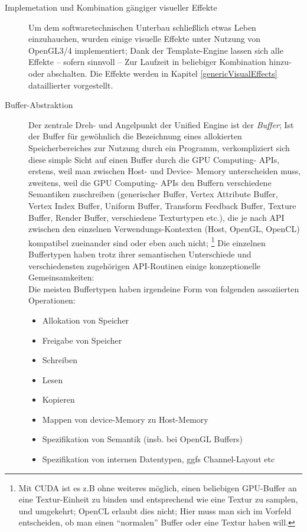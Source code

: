 \begin{description}
	
	\item[Implemetation und Kombination gängiger visueller Effekte]
	Um dem softwaretechnischen Unterbau schließlich etwas Leben einzuhauchen, wurden einige visuelle Effekte unter
	Nutzung von OpenGL3/4 implementiert; Dank der Template-Engine lassen sich alle Effekte -- sofern sinnvoll --
	Zur Laufzeit in beliebiger Kombination hinzu- oder abschalten.
	Die Effekte werden in Kapitel \ref{genericVisualEffects} dataillierter vorgestellt.
	

	\item[Buffer-Abstraktion]
	Der zentrale Dreh- und Angelpunkt der Unified Engine ist der \emph{Buffer};
	Ist der Buffer für gewöhnlich die Bezeichnung eines allokierten Speicherbereiches zur Nutzung durch ein Programm,
	verkompliziert sich diese simple Sicht auf einen Buffer durch die GPU Computing- APIs, erstens, weil man zwischen
	Host- und Device- Memory unterscheiden muss, zweitens, weil die GPU Computing- APIs den Buffern verschiedene Semantiken
	zuschreiben (generischer Buffer, Vertex Attribute Buffer, Vertex Index Buffer, Uniform Buffer, 
	Transform Feedback Buffer, Texture Buffer, Render Buffer, verschiedene Texturtypen etc.), 
	die je nach API zwischen den einzelnen Verwendungs-Kontexten (Host, OpenGL, OpenCL) 
	kompatibel zueinander sind oder eben auch nicht;
	\footnote{Mit CUDA ist es z.B ohne weiteres möglich, einen beliebigen GPU-Buffer an eine Textur-Einheit zu binden und 	
	entsprechend wie eine Textur zu samplen, und umgekehrt; OpenCL erlaubt dies nicht; Hier muss man sich im Vorfeld 
	entscheiden, ob man einen "`normalen"' Buffer oder eine Textur haben will.}
	Die einzelnen Buffertypen haben trotz ihrer semantischen Unterschiede und verschiedensten zugehörigen API-Routinen
	einige konzeptionelle Gemeinsamkeiten:\\
	Die meisten Buffertypen haben irgendeine Form von folgenden assoziierten Operationen:
	\begin{itemize}
		\item Allokation von Speicher
		\item Freigabe von Speicher
		\item Schreiben
		\item Lesen
		\item Kopieren
		\item Mappen von device-Memory zu Host-Memory
		\item Spezifikation von Semantik (insb. bei OpenGL Buffers)
		\item Spezifikation von internen Datentypen, ggfs Channel-Layout etc

\end{itemize}
\end{description}
